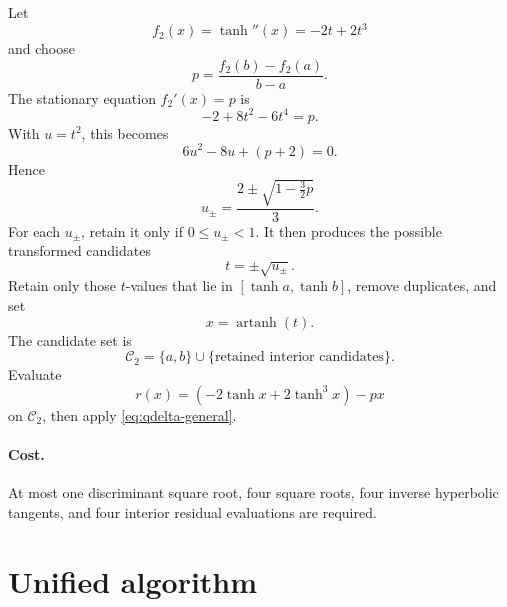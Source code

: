 \documentclass[11pt]{article}
\newcommand{\artanh}{\operatorname{artanh}}
\newcommand{\cand}{\mathcal{C}}
\begin{document}
Let
\[
  f_2(x)=\tanh''(x)=-2t+2t^3
\]
and choose
\begin{equation}\label{eq:p2}
  p=\frac{f_2(b)-f_2(a)}{b-a}.
\end{equation}
The stationary equation \(f_2'(x)=p\) is
\[
  -2+8t^2-6t^4=p.
\]
With \(u=t^2\), this becomes
\begin{equation}\label{eq:quadraticu}
  6u^2-8u+(p+2)=0.
\end{equation}
Hence
\begin{equation}\label{eq:uroots}
  u_\pm=\frac{2\pm\sqrt{1-\frac{3}{2}p}}{3}.
\end{equation}
For each \(u_\pm\), retain it only if \(0\le u_\pm<1\). It then produces the possible transformed candidates
\begin{equation}\label{eq:t2candidates}
  t=\pm\sqrt{u_\pm}.
\end{equation}
Retain only those \(t\)-values that lie in \([\tanh a,\tanh b]\), remove duplicates, and set
\[
  x=\artanh(t).
\]
The candidate set is
\begin{equation}\label{eq:C2}
  \cand_2=\{a,b\}\cup\{\text{retained interior candidates}\}.
\end{equation}
Evaluate
\[
  r(x)=(-2\tanh x+2\tanh^3x)-px
\]
on \(\cand_2\), then apply \eqref{eq:qdelta-general}.

\paragraph{Cost.}
At most one discriminant square root, four square roots, four inverse hyperbolic tangents, and four interior residual evaluations are required.

\section{Unified algorithm}
\end{document}
